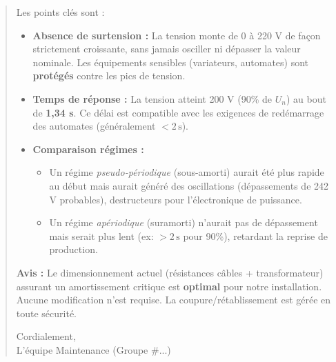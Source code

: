\documentclass[11pt]{article}
\begin{document}
\begin{exoresolu}
\begin{quote}
Les points clés sont :
\begin{itemize}
    \item \textbf{Absence de surtension :} La tension monte de 0 à 220 V de façon strictement croissante, sans jamais osciller ni dépasser la valeur nominale. Les équipements sensibles (variateurs, automates) sont \textbf{protégés} contre les pics de tension.
    \item \textbf{Temps de réponse :} La tension atteint 200 V (90\% de $U_n$) au bout de \textbf{1,34 s}. Ce délai est compatible avec les exigences de redémarrage des automates (généralement $< 2\,\text{s}$).
    \item \textbf{Comparaison régimes :}
    \begin{itemize}
        \item Un régime \emph{pseudo-périodique} (sous-amorti) aurait été plus rapide au début mais aurait généré des oscillations (dépassements de 242 V probables), destructeurs pour l'électronique de puissance.
        \item Un régime \emph{apériodique} (suramorti) n'aurait pas de dépassement mais serait plus lent (ex: $> 2\,\text{s}$ pour 90\%), retardant la reprise de production.
    \end{itemize}
\end{itemize}
\textbf{Avis :} Le dimensionnement actuel (résistances câbles + transformateur) assurant un amortissement critique est \textbf{optimal} pour notre installation. Aucune modification n'est requise. La coupure/rétablissement est gérée en toute sécurité.

Cordialement, \\
L'équipe Maintenance (Groupe \#...)
\end{quote}
\end{exoresolu}
\end{document}
